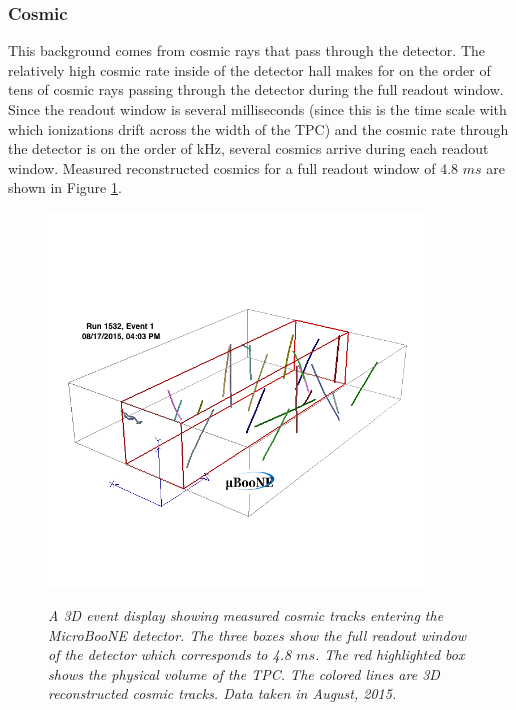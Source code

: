 \subsubsection{Cosmic}
This background comes from cosmic rays that pass through the detector. The relatively high cosmic rate inside of the detector hall makes for on the order of tens of cosmic rays passing through the detector during the full readout window. Since the readout window is several milliseconds (since this is the time scale with which ionizations drift across the width of the TPC) and the cosmic rate through the detector is on the order of kHz, several cosmics arrive during each readout window. Measured reconstructed cosmics for a full readout window of 4.8 $ms$ are shown in Figure \ref{UB_publicplot_3dcosmics}.\\


\begin{figure}[ht!]
\centering
\includegraphics[width=0.9\textwidth]{Figures/UB_publicplot_3dcosmics.png}\\
\caption{\textit{A 3D event display showing measured cosmic tracks entering the MicroBooNE detector. The three boxes show the full readout window of the detector which corresponds to 4.8 $ms$. The red highlighted box shows the physical volume of the TPC. The colored lines are 3D reconstructed cosmic tracks. Data taken in August, 2015.}}
\label{UB_publicplot_3dcosmics}
\end{figure}


